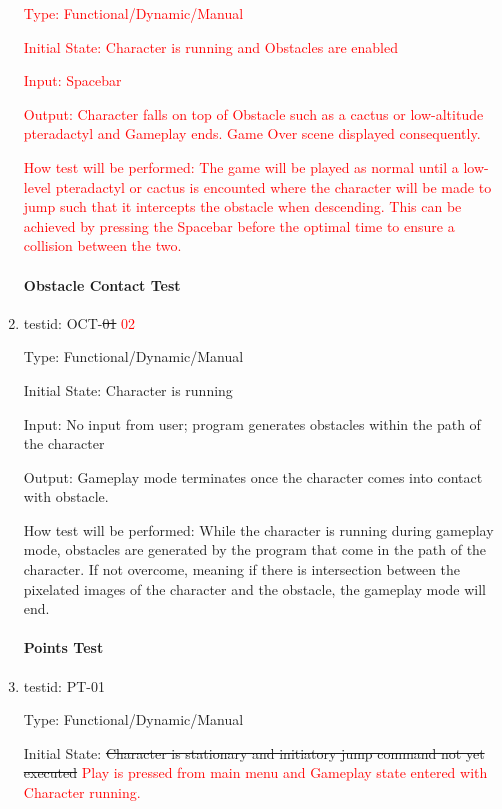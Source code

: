 \documentclass[12pt, titlepage]{article}
\begin{document}
\begin{enumerate}
\textcolor{red}{Type: Functional/Dynamic/Manual}

\textcolor{red}{Initial State: Character is running and Obstacles are enabled}

\textcolor{red}{Input: Spacebar}

\textcolor{red}{Output: Character falls on top of Obstacle such as a cactus or low-altitude pteradactyl and Gameplay ends. Game Over scene displayed consequently.}

\textcolor{red}{How test will be performed: The game will be played as normal until a low-level pteradactyl or cactus is encounted where the character will be made to jump such that it intercepts the obstacle when descending. This can be achieved by pressing the Spacebar before the optimal time to ensure a collision between the two.}


\paragraph{Obstacle Contact Test}
				
\item{testid: OCT-\sout{01} \textcolor{red}{02}\\}

Type: Functional/Dynamic/Manual
					
Initial State: Character is running
					
Input: No input from user; program generates obstacles within the path of the character
					
Output: Gameplay mode terminates once the character comes into contact with obstacle.
					
How test will be performed: While the character is running during gameplay mode, obstacles are generated by the program that come in the path of the character. If not overcome, meaning if there is intersection between the pixelated images of the character and the obstacle, the gameplay mode will end. \\


\paragraph{Points Test}

\item{testid: PT-01\\}

Type: Functional/Dynamic/Manual
					
Initial State: \sout{Character is stationary and initiatory jump command not yet executed} \textcolor{red}{Play is pressed from main menu and Gameplay state entered with Character running.}
					

\end{enumerate}
\end{document}
